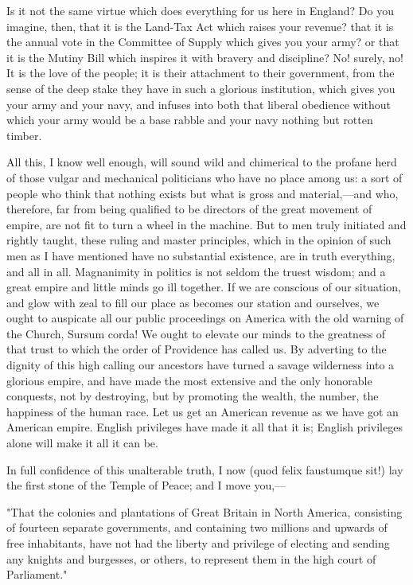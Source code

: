 Is it not the same virtue which does everything for us here in England? Do you imagine, then, that it is the Land-Tax Act which raises your revenue? that it is the annual vote in the Committee of Supply which gives you your army? or that it is the Mutiny Bill which inspires it with bravery and discipline? No! surely, no! It is the love of the people; it is their attachment to their government, from the sense of the deep stake they have in such a glorious institution, which gives you your army and your navy, and infuses into both that liberal obedience without which your army would be a base rabble and your navy nothing but rotten timber.

All this, I know well enough, will sound wild and chimerical to the profane herd of those vulgar and mechanical politicians who have no place among us: a sort of people who think that nothing exists but what is gross and material,—and who, therefore, far from being qualified to be directors of the great movement of empire, are not fit to turn a wheel in the machine. But to men truly initiated and rightly taught, these ruling and master principles, which in the opinion of such men as I have mentioned have no substantial existence, are in truth everything, and all in all. Magnanimity in politics is not seldom the truest wisdom; and a great empire and little minds go ill together. If we are conscious of our situation, and glow with zeal to fill our place as becomes our station and ourselves, we ought to auspicate all our public proceedings on America with the old warning of the Church, Sursum corda! We ought to elevate our minds to the greatness of that trust to which the order of Providence has called us. By adverting to the dignity of this high calling our ancestors have turned a savage wilderness into a glorious empire, and have made the most extensive and the only honorable conquests, not by destroying, but by promoting the wealth, the number, the happiness of the human race. Let us get an American revenue as we have got an American empire. English privileges have made it all that it is; English privileges alone will make it all it can be.

In full confidence of this unalterable truth, I now (quod felix faustumque sit!) lay the first stone of the Temple of Peace; and I move you,—

"That the colonies and plantations of Great Britain in North America, consisting of fourteen separate governments, and containing two millions and upwards of free inhabitants, have not had the liberty and privilege of electing and sending any knights and burgesses, or others, to represent them in the high court of Parliament."

